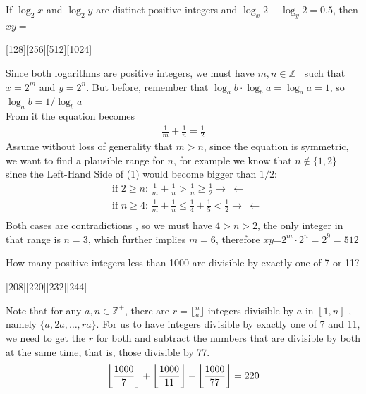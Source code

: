 \documentclass[12pt]{article}
\newcounter{problem}
\begin{document}
\begin{problem}
   If \( \log_2 x \) and \( \log_2 y \) are distinct positive integers and \( \log_x 2 + \log_y 2 = 0.5 \), then \( xy = \)
\end{problem}
[128][256][512][1024]
\begin{solution}[D]
   Since both logarithms are positive integers, we must have $m,n \in \mathbb{Z}^+$ such that $x=2^m$ and $y=2^n$. But before, remember that 
    $\log_ab \cdot \log_ba = \log_aa=1$, so $\log_ab=1/\log_ba$
    \\From it the equation becomes 
    \begin{align}
        \frac{1}{m} + \frac{1}{n} = \frac{1}{2}
    \end{align}
    Assume without loss of generality that $m>n$, since the equation is symmetric, we want to find a plausible range for $n$, for example we know that $n \notin \{1,2\}$ since the Left-Hand Side of (1) would become bigger than $1/2$:
    \begin{align*}
        &\text{if $2\geq n$:  } \frac{1}{m}+\frac{1}{n} > \frac{1}{n} \geq \frac{1}{2} \rightarrow \hspace{3pt} \leftarrow \\
        &\text{if $n\geq 4$:  } \frac{1}{m}+\frac{1}{n} \leq \frac{1}{4} + \frac{1}{5} < \frac{1}{2} \rightarrow \hspace{3pt} \leftarrow \\
    \end{align*}
    Both cases are contradictions , so we must have $4>n>2$, the only integer in that range is $n=3$, which further implies $m=6$, therefore $xy$=$2^m \cdot 2^n = 2^9=512$
\end{solution}

\begin{problem}[C][1][AMATYC Spring 2017/16]
   How many positive integers less than 1000 are divisible by exactly one of 7 or 11?
\end{problem}
[208][220][232][244]
\begin{solution}[C]
    Note that for any $a,n \in \mathbb{Z}^+$, there are $r=\lfloor \frac{n}{a} \rfloor$ integers divisible by $a$ in $[1,n]$ , namely $\{a,2a,\ldots,ra\}$. For us to have integers divisible by exactly one of 7 and 11, we need to get the $r$ for both and subtract the numbers that are divisible by both at the same time, that is, those divisible by 77.
    $$ \myFloor[7]{1000}+\myFloor[11]{1000}-\myFloor[77]{1000} = 220$$
\end{solution}
\end{document}
